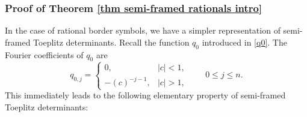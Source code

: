 \documentclass[pdftex]{sigma}
\numberwithin{equation}{section}
\begin{document}
\subsubsection{Proof of Theorem \ref{thm semi-framed rationals intro}}
		
In the case of rational border symbols, we have a simpler representation of semi-framed Toeplitz determinants. Recall the function $q_0$ introduced in \eqref{q0}.
		The Fourier coefficients of $q_0$ are
		\begin{equation}\label{q0 Fourier Coefficients}
			q_{0,j} = \begin{cases}
				0, & |c|<1, \\
				-(c)^{-j-1}, & |c|>1,
			\end{cases} \qquad 0 \leq j \leq n.
		\end{equation}
		This immediately leads to the following elementary property of semi-framed Toeplitz determinants:
		
\end{document}
